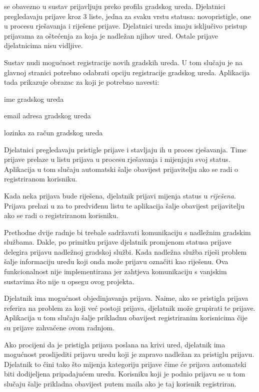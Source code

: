 		 se obavezno u sustav prijavljuju preko profila gradskog ureda. Djelatnici pregledavaju prijave kroz 3 liste, jedna za svaku vrstu statusa: novopristigle, one u procesu rješavanja i riješene prijave. Djelatnici ureda imaju isključivo pristup prijavama za oštećenja za koja je nadležan njihov ured. Ostale prijave djelatnicima nisu vidljive.
		
		Sustav nudi mogućnost registracije novih gradskih ureda. U tom slučaju je na glavnoj stranici potrebno odabrati opciju registracije gradskog ureda. Aplikacija tada prikazuje obrazac za koji je potrebno navesti:
		\begin{packed_item} 
			\item ime gradskog ureda
			\item email adresa gradskog ureda
			\item lozinka za račun gradskog ureda
		\end{packed_item}
		
		Djelatnici pregledavaju pristigle prijave i stavljaju ih u proces rješavanja. Time prijave prelaze u listu prijava u procesu rješavanja i mijenjaju svoj status. Aplikacija u tom slučaju automatski šalje obavijest prijavitelju ako se radi o registriranom korisniku.
		
		Kada neka prijava bude riješena, djelatnik prijavi mijenja status u \textit{riješena}. Prijava prelazi u za to predviđenu listu te aplikacija šalje obavijest prijavitelju ako se radi o registriranom korisniku.
		
		Prethodne dvije radnje bi trebale sadržavati komunikaciju s nadležnim gradskim službama. Dakle, po primitku prijave djelatnik promjenom statusa prijave delegira prijavu nadležnoj gradskoj službi. Kada nadležna služba riješi problem šalje informaciju uredu koji onda može prijavu označiti kao riješenu. Ova funkcionalnost nije implementirana jer zahtjeva komunikaciju s vanjskim sustavima što nije u opsegu ovog projekta.
		
		Djelatnik ima mogućnost objedinjavanja prijava. Naime, ako se pristigla prijava referira na problem za koji već postoji prijava, djelatnik može grupirati te prijave. Aplikacija u tom slučaju šalje prikladnu obavijest registriranim korisnicima čije su prijave zahvaćene ovom radnjom.
		
		Ako procijeni da je pristigla prijava poslana na krivi ured, djelatnik ima mogućnost proslijediti prijavu uredu koji je zapravo nadležan za pristiglu prijavu. Djelatnik to čini tako što mijenja kategoriju prijave čime će prijava automatski biti dodijeljena pripadajućem uredu. Korisniku koji je podnio prijavu se u tom slučaju šalje prikladna obavijest putem maila ako je taj korisnik registriran.
		
